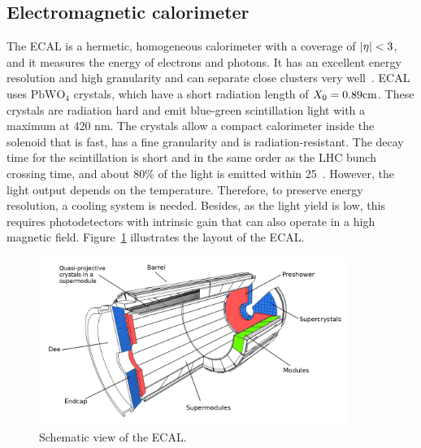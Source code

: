 \subsection{Electromagnetic calorimeter}

The ECAL is a hermetic, homogeneous calorimeter with a coverage of $\lvert\eta\rvert < 3$, and it measures the energy of electrons and photons. It has an excellent energy resolution and high granularity and can separate close clusters very well~\cite{CMS:2010bta, Khachatryan:2015hwa}. ECAL uses $\text{PbWO}_4$ crystals, which have a short radiation length of $X_0 = 0.89 \text{cm}$. These crystals are radiation hard and emit blue-green scintillation light with a maximum at 420 nm. The crystals allow a compact calorimeter inside the solenoid that is fast, has a fine granularity and is radiation-resistant. The decay time for the scintillation is short and in the same order as the LHC bunch crossing time, and about 80\% of the light is emitted within 25~\ns. However, the light output depends on the temperature. Therefore, to preserve energy resolution, a cooling system is needed. Besides, as the light yield is low, this requires photodetectors with intrinsic gain that can also operate in a high magnetic field. Figure~\ref{fig:ecal} illustrates the layout of the ECAL.

\begin{figure}[htbp]
  \centering
  \includegraphics[width=0.9\textwidth]{plots/chapter3/ecal.png}
  \caption{Schematic view of the ECAL.}
  \label{fig:ecal}
\end{figure}

